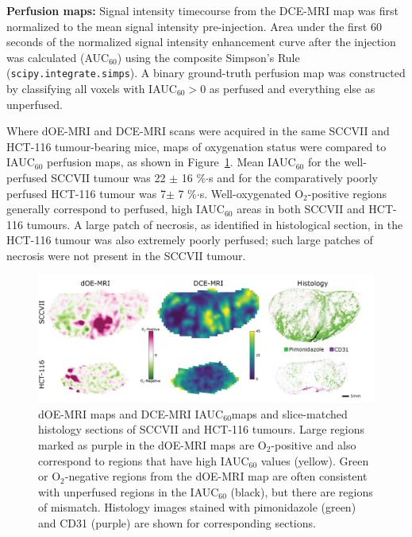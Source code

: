 \noindent\textbf{Perfusion maps:} Signal intensity timecourse from the DCE-MRI map was first normalized to the mean signal intensity pre-injection.
Area under the first 60 seconds of the normalized signal intensity enhancement curve after the injection was calculated (\acs{AUC}$_{60}$) using the composite Simpson's Rule (\texttt{scipy.integrate.simps}).
A binary ground-truth perfusion map was constructed by classifying all voxels with IAUC$_{60} > 0$ as perfused and everything else as unperfused.

Where \ac{dOE-MRI} and DCE-MRI scans were acquired in the same SCCVII and HCT-116 tumour-bearing mice,  maps of oxygenation status were compared to IAUC$_{60}$ perfusion maps, as shown in Figure~\ref{fig_perfusion}.
Mean IAUC$_{60}$ for the well-perfused SCCVII tumour was 22 $\pm$ 16 \%$\cdot$s and for the comparatively poorly perfused HCT-116 tumour was 7$\pm$ 7 \%$\cdot$s.
Well-oxygenated O$_2$-positive regions generally correspond to perfused, high IAUC$_{60}$ areas in both SCCVII and HCT-116 tumours.
A large patch of necrosis, as identified in histological section, in the HCT-116 tumour was also extremely poorly perfused; such large patches of necrosis were not present in the SCCVII tumour.

\begin{figure}[htbp]
   \centering
   \includegraphics[width=\textwidth]{futurework/futurework-images/fig_perfusion.png} %
   \caption{\ac{dOE-MRI} maps and DCE-MRI IAUC$_{60}$maps and slice-matched histology sections of SCCVII and HCT-116 tumours. Large regions marked as purple in the \ac{dOE-MRI} maps are O$_2$-positive and also correspond to regions that have high IAUC$_{60}$ values (yellow). Green or O$_2$-negative regions from the \ac{dOE-MRI} map are often consistent with unperfused regions in the IAUC$_{60}$ (black), but there are regions of mismatch. Histology images stained with pimonidazole (green) and CD31 (purple) are shown for corresponding sections.
   \label{fig_perfusion}}
\end{figure}

